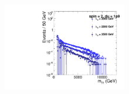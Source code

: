 \begin{figure}[htbp!]
\begin{center}
\includegraphics[angle=0,width=0.48\textwidth]{fig/UnparToGG_Spin2_du1p9_TuneCP2_13TeV_pythia8_2018_bkg_sub.pdf}
\end{center}
\label{fig:BkgSub}
\end{figure}



\newpage
% 
% 

